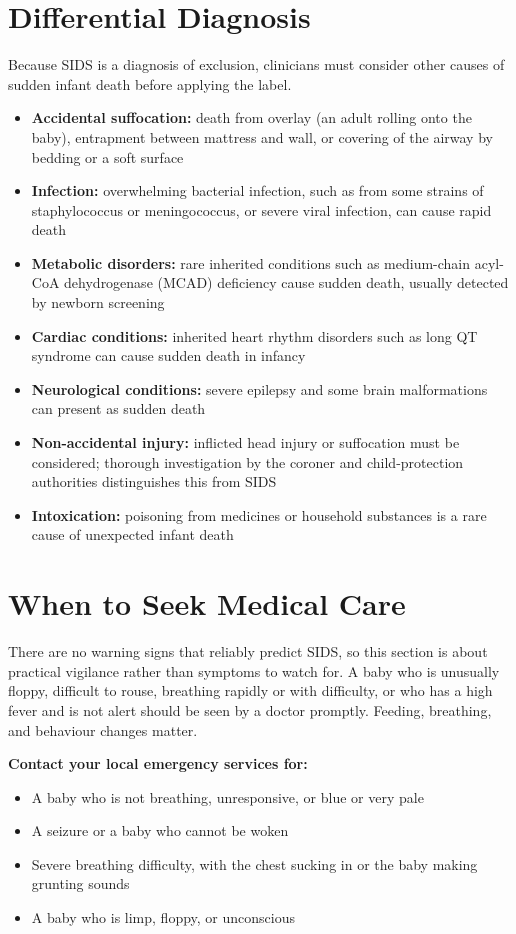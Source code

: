 \section*{Differential Diagnosis}
Because SIDS is a diagnosis of exclusion, clinicians must consider other causes of sudden infant death before applying the label.

\begin{itemize}
    \item \textbf{Accidental suffocation:} death from overlay (an adult rolling onto the baby), entrapment between mattress and wall, or covering of the airway by bedding or a soft surface
    \item \textbf{Infection:} overwhelming bacterial infection, such as from some strains of staphylococcus or meningococcus, or severe viral infection, can cause rapid death
    \item \textbf{Metabolic disorders:} rare inherited conditions such as medium-chain acyl-CoA dehydrogenase (MCAD) deficiency cause sudden death, usually detected by newborn screening
    \item \textbf{Cardiac conditions:} inherited heart rhythm disorders such as long QT syndrome can cause sudden death in infancy
    \item \textbf{Neurological conditions:} severe epilepsy and some brain malformations can present as sudden death
    \item \textbf{Non-accidental injury:} inflicted head injury or suffocation must be considered; thorough investigation by the coroner and child-protection authorities distinguishes this from SIDS
    \item \textbf{Intoxication:} poisoning from medicines or household substances is a rare cause of unexpected infant death
\end{itemize}

\section*{When to Seek Medical Care}
There are no warning signs that reliably predict SIDS, so this section is about practical vigilance rather than symptoms to watch for. A baby who is unusually floppy, difficult to rouse, breathing rapidly or with difficulty, or who has a high fever and is not alert should be seen by a doctor promptly. Feeding, breathing, and behaviour changes matter.

\textbf{Contact your local emergency services for:}
\begin{itemize}
    \item A baby who is not breathing, unresponsive, or blue or very pale
    \item A seizure or a baby who cannot be woken
    \item Severe breathing difficulty, with the chest sucking in or the baby making grunting sounds
    \item A baby who is limp, floppy, or unconscious
\end{itemize}

